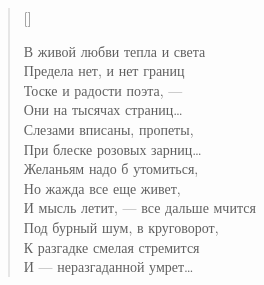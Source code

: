 
\vspace*{0cm}

\settowidth{\versewidth}{В живой любви тепла и света}
\begin{verse}[\versewidth]
\begin{altverse}
В живой любви тепла и света\\
Предела нет, и нет границ\\
Тоске и радости поэта, --- \\
Они на тысячах страниц\ldots\\
Слезами вписаны, пропеты, \\
При блеске розовых зарниц\ldots\\
Желаньям надо б утомиться,\\
Но жажда все еще живет,\\
И мысль летит, --- все дальше мчится\\
Под бурный шум, в круговорот,\\
К разгадке смелая стремится\\
И --- неразгаданной умрет\ldots
\end{altverse}
\end{verse}

\newpage
\vspace*{0cm}

